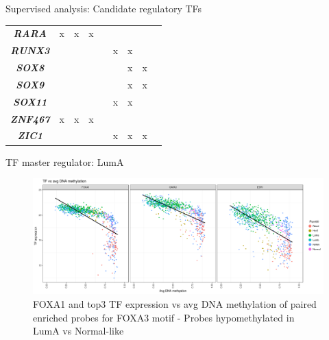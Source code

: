\documentclass[slidestop,compress,11pt,xcolor=dvipsnames]{beamer}
\begin{document}
\begin{frame}{Supervised analysis: Candidate regulatory TFs }
\begin{table}[]
\begin{tabular}{@{}|c|c|c|c|c|c|c|c|c|@{}}
\textit{\textbf{RARA}} & x & x & x &  &  &  &  &  \\
\textit{\textbf{RUNX3}} &  &  &  &  & x & x &  &  \\
\textit{\textbf{SOX8}} &  &  &  &  &  & x & x &  \\
\textit{\textbf{SOX9}} &  &  &  &  &  & x & x &  \\
\textit{\textbf{SOX11}} &  &  &  &  & x & x &  &  \\
\textit{\textbf{ZNF467}} & x & x & x &  &  &  &  &  \\
\textit{\textbf{ZIC1}} &  &  &  &  & x & x & x &  \\ \bottomrule
\end{tabular}
\end{table}
\end{frame}




\begin{frame}{TF master regulator: LumA}

 \begin{figure}[ht!]
  \centering
  \includegraphics[width=1.0\textwidth]{ELMER/FOXA3_motif.png}
  \caption{\label{fig:chiapet} FOXA1 and top3 TF expression vs avg DNA methylation of paired enriched probes for FOXA3 motif - Probes hypomethylated in LumA vs Normal-like}
 \end{figure}
\end{frame}
\end{document}
